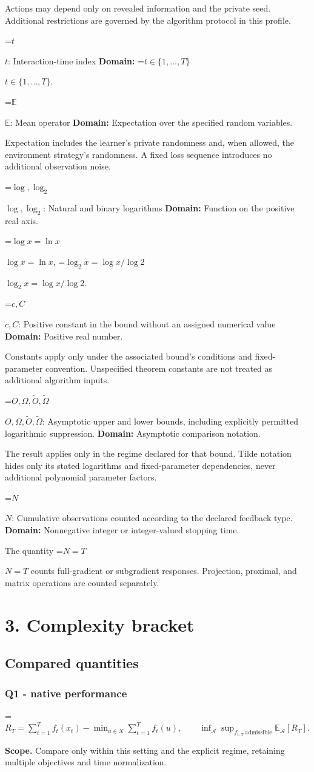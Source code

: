 \documentclass[10pt,a4paper]{article}
\newcommand{\AtlasMath}[1]{\par\begingroup\centering\setbox0=\hbox{$\displaystyle #1$}\ifdim\wd0>1.4\linewidth\typeout{ATLAS WIDE FORMULA: \the\wd0}\fi\ifdim\wd0>\linewidth\resizebox{\linewidth}{!}{\box0}\else\box0\fi\par\endgroup}
\newcommand{\AtlasInlineMath}[1]{\begingroup\setbox0=\hbox{$#1$}\ifdim\wd0>.4\linewidth\endgroup\AtlasMath{#1}\else\endgroup$#1$\fi}
\begin{document}
Actions may depend only on revealed information and the private seed. Additional restrictions are governed by the algorithm protocol in this profile.

\AtlasInlineMath{t}: Interaction-time index \textbf{Domain:} \AtlasInlineMath{t\in\{1,\ldots,T\}}.

\AtlasInlineMath{\mathbb E}: Mean operator \textbf{Domain:} Expectation over the specified random variables.

Expectation includes the learner's private randomness and, when allowed, the environment strategy's randomness. A fixed loss sequence introduces no additional observation noise.

\AtlasInlineMath{\log,\log_2}: Natural and binary logarithms \textbf{Domain:} Function on the positive real axis.

\AtlasInlineMath{\log x=\ln x}, \AtlasInlineMath{\log_2x=\log x/\log2}.

\AtlasInlineMath{c,C}: Positive constant in the bound without an assigned numerical value \textbf{Domain:} Positive real number.

Constants apply only under the associated bound’s conditions and fixed-parameter convention. Unspecified theorem constants are not treated as additional algorithm inputs.

\AtlasInlineMath{O,\Omega,\widetilde O,\widetilde\Omega}: Asymptotic upper and lower bounds, including explicitly permitted logarithmic suppression. \textbf{Domain:} Asymptotic comparison notation.

The result applies only in the regime declared for that bound. Tilde notation hides only its stated logarithms and fixed-parameter dependencies, never additional polynomial parameter factors.

\AtlasInlineMath{N}: Cumulative observations counted according to the declared feedback type. \textbf{Domain:} Nonnegative integer or integer-valued stopping time.

The quantity \AtlasInlineMath{N=T} counts full-gradient or subgradient responses. Projection, proximal, and matrix operations are counted separately.

\section{3. Complexity bracket}
\subsection{Compared quantities}
\subsubsection{Q1 - native performance}
\AtlasMath{R_T=\sum_{t=1}^{T}f_t(x_t)-\min_{u\in X}\sum_{t=1}^{T}f_t(u),\qquad \inf_{\mathcal A}\sup_{f_{1:T}\ \text{admissible}}\mathbb E_{\mathcal A}[R_T].}
\textbf{Scope.} Compare only within this setting and the explicit regime, retaining multiple objectives and time normalization.
\end{document}
